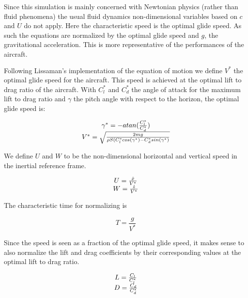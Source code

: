 \par Since this simulation is mainly concerned with Newtonian physics (rather than fluid phenomena) the usual fluid dynamics non-dimensional variables based on $c$ and $U$ do not apply.
Here the characteristic speed is the optimal glide speed.
As such the equations are normalized by the optimal glide speed and $g$, the gravitational acceleration.
This is more representative of the performances of the aircraft.

\par Following Lissaman's \cite{lissaman2005wind} implementation of the equation of motion we define $V^*$ the optimal glide speed for the aircraft. 
This speed is achieved at the optimal lift to drag ratio of the aircraft.
With $C_l^*$ and $C_d^*$ the angle of attack for the maximum lift to drag ratio and $\gamma$ the pitch angle with respect to the horizon, the optimal glide speed is:

\begin{equation}
\begin{array}[c]{c}
  \gamma^*= - atan(\frac{C_l^*}{C_d^*}) \\
  V^* = \sqrt{\frac{2mg}{\rho S (C_l^* cos(\gamma^*) - C_d^* sin(\gamma^*)}}
\end{array}
\label{eqn:glide_speed}
\end{equation}

\par We define $U$ and $W$ to be the non-dimensional horizontal and vertical speed in the inertial reference frame.

\begin{equation}
\begin{array}[c]{c}
  U = \frac{\dot{x}}{V^*} \\
  W= \frac{\dot{z}}{V^*}
\end{array}
\label{eqn:non_dim_speed}
\end{equation}

The characteristic time for normalizing is

\begin{equation}
  T = \frac{g}{V^*}
  \label{eqn:T}
\end{equation}

\par Since the speed is seen as a fraction of the optimal glide speed, it makes sense to also normalize the lift and drag coefficients by their corresponding values at the optimal lift to drag ratio.

\begin{equation}
\begin{array}[c]{c}
  L= \frac{C_l}{C_l^*} \\
  D= \frac{C_d}{C_d^*} 
\end{array}
\label{eqn:non_dim_coef}
\end{equation}

